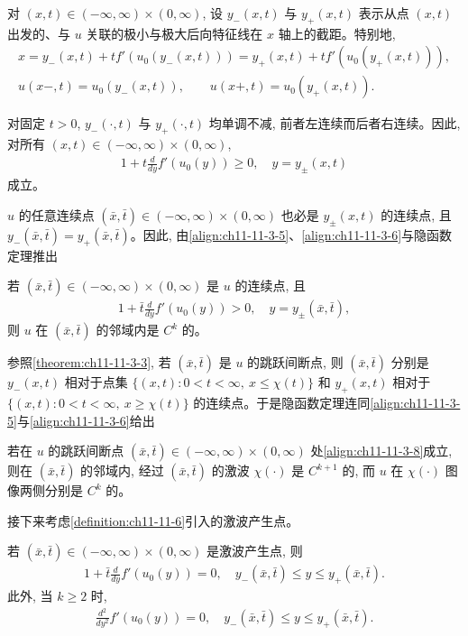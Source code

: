 \documentclass[../../main.tex]{subfiles}
\begin{document}
对 $(x,t)\in(-\infty,\infty)\times(0,\infty)$, 设 $y_-(x,t)$ 与 $y_+(x,t)$ 表示从点 $(x,t)$ 出发的、与 $u$ 关联的极小与极大后向特征线在 $x$ 轴上的截距。特别地,
\begin{align}
x=y_-(x,t)+tf'(u_0(y_-(x,t)))=y_+(x,t)+tf'(u_0(y_+(x,t))),\label{align:ch11-11-3-5}\\
u(x-,t)=u_0(y_-(x,t)),\qquad u(x+,t)=u_0(y_+(x,t)).\label{align:ch11-11-3-6}
\end{align}

对固定 $t>0$, $y_-(\cdot,t)$ 与 $y_+(\cdot,t)$ 均单调不减, 前者左连续而后者右连续。因此, 对所有 $(x,t)\in(-\infty,\infty)\times(0,\infty)$,
\begin{align}
1+t\frac{d}{dy}f'(u_0(y))\geqslant0,\quad y=y_\pm(x,t)\label{align:ch11-11-3-7}
\end{align}
成立。

$u$ 的任意连续点 $(\bar x,\bar t)\in(-\infty,\infty)\times(0,\infty)$ 也必是 $y_\pm(x,t)$ 的连续点, 且 $y_-(\bar x,\bar t)=y_+(\bar x,\bar t)$。因此, 由\eqref{align:ch11-11-3-5}、\eqref{align:ch11-11-3-6}与隐函数定理推出

\begin{theorem}\label{theorem:ch11-11-3-7}
若 $(\bar x,\bar t)\in(-\infty,\infty)\times(0,\infty)$ 是 $u$ 的连续点, 且
\begin{align}
1+\bar t\frac{d}{dy}f'(u_0(y))>0,\quad y=y_\pm(\bar x,\bar t),\label{align:ch11-11-3-8}
\end{align}
则 $u$ 在 $(\bar x,\bar t)$ 的邻域内是 $C^k$ 的。
\end{theorem}

参照\cref{theorem:ch11-11-3-3}, 若 $(\bar x,\bar t)$ 是 $u$ 的跳跃间断点, 则 $(\bar x,\bar t)$ 分别是 $y_-(x,t)$ 相对于点集 $\{(x,t):0<t<\infty,\ x\leqslant\chi(t)\}$ 和 $y_+(x,t)$ 相对于 $\{(x,t):0<t<\infty,\ x\geqslant\chi(t)\}$ 的连续点。于是隐函数定理连同\eqref{align:ch11-11-3-5}与\eqref{align:ch11-11-3-6}给出

\begin{theorem}\label{theorem:ch11-11-3-8}
若在 $u$ 的跳跃间断点 $(\bar x,\bar t)\in(-\infty,\infty)\times(0,\infty)$ 处\eqref{align:ch11-11-3-8}成立, 则在 $(\bar x,\bar t)$ 的邻域内, 经过 $(\bar x,\bar t)$ 的激波 $\chi(\cdot)$ 是 $C^{k+1}$ 的, 而 $u$ 在 $\chi(\cdot)$ 图像两侧分别是 $C^k$ 的。
\end{theorem}

接下来考虑\cref{definition:ch11-11-6}引入的激波产生点。

\begin{theorem}\label{theorem:ch11-11-3-9}
若 $(\bar x,\bar t)\in(-\infty,\infty)\times(0,\infty)$ 是激波产生点, 则
\begin{align}
1+\bar t\frac{d}{dy}f'(u_0(y))=0,\quad y_-(\bar x,\bar t)\leqslant y\leqslant y_+(\bar x,\bar t).\label{align:ch11-11-3-9}
\end{align}
此外, 当 $k\geqslant2$ 时,
\begin{align}
\frac{d^2}{dy^2}f'(u_0(y))=0,\quad y_-(\bar x,\bar t)\leqslant y\leqslant y_+(\bar x,\bar t).\label{align:ch11-11-3-10}
\end{align}
\end{theorem}
\end{document}
